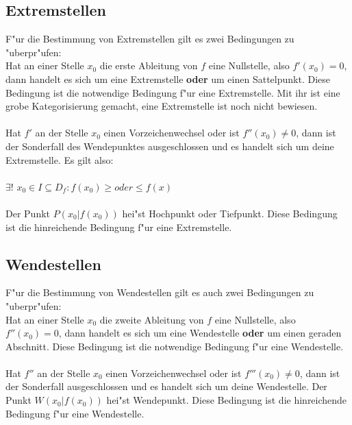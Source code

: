 \subsection{Extremstellen}

F"ur die Bestimmung von Extremstellen gilt es zwei Bedingungen zu "uberpr"ufen:\\

Hat an einer Stelle $x_{0}$ die erste Ableitung von $f$ eine Nullstelle, also $f'(x_{0}) = 0$, dann handelt es sich um eine Extremstelle \textbf{oder} um einen Sattelpunkt. Diese Bedingung ist die notwendige Bedingung f"ur eine Extremstelle. Mit ihr ist eine grobe Kategorisierung gemacht, eine Extremstelle ist noch nicht bewiesen.  \\\\

Hat $f'$ an der Stelle $x_{0}$ einen Vorzeichenwechsel oder ist $f''(x_{0})\neq 0$, dann ist der Sonderfall des Wendepunktes ausgeschlossen und es handelt sich um deine Extremstelle. Es gilt also: \\\\ $\exists! $ $ x_{0} \in I \subseteq D_{f} : f(x_{0}) \geq oder \leq f(x) $ \\\\ Der Punkt $P(x_{0}|f(x_{0}))$ hei"st Hochpunkt oder Tiefpunkt. Diese Bedingung ist die hinreichende Bedingung f"ur eine Extremstelle.

\subsection{Wendestellen}

F"ur die Bestimmung von Wendestellen gilt es auch zwei Bedingungen zu "uberpr"ufen:\\

Hat an einer Stelle $x_{0}$ die zweite Ableitung von $f$ eine Nullstelle, also $f''(x_{0}) = 0$, dann handelt es sich um eine Wendestelle \textbf{oder} um einen geraden Abschnitt. Diese Bedingung ist die notwendige Bedingung f"ur eine Wendestelle. \\\\

Hat $f''$ an der Stelle $x_{0}$ einen Vorzeichenwechsel oder ist $f'''(x_{0})\neq 0$, dann ist der Sonderfall ausgeschlossen und es handelt sich um deine Wendestelle. Der Punkt $W(x_{0}|f(x_{0}))$ hei"st Wendepunkt. Diese Bedingung ist die hinreichende Bedingung f"ur eine Wendestelle.\\\\

